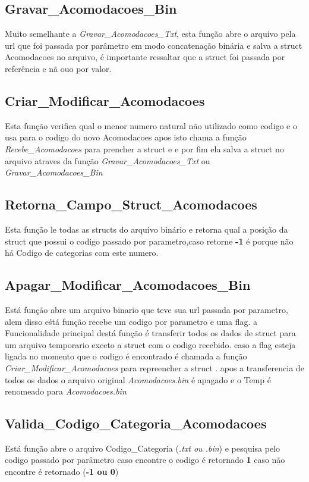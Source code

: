 \documentclass{article}
\begin{document}
\subsection{Gravar\_Acomodacoes\_Bin}
	Muito semelhante a \textit{Gravar\_Acomodacoes\_Txt}, esta função abre o arquivo pela url que foi passada por parâmetro em modo concatenação binária e salva a struct Acomodacoes  no arquivo, é importante ressaltar que  a struct foi passada por referência e nã ouo por valor.

\subsection{Criar\_Modificar\_Acomodacoes}
	Esta função verifica qual o menor numero natural não utilizado como codigo e o usa para o codigo do novo Acomodacoes apos isto  chama a função \textit{Recebe\_Acomodacoes} para prencher a struct e e por fim ela salva a struct no arquivo atraves da função \textit{Gravar\_Acomodacoes\_Txt} ou \textit{Gravar\_Acomodacoes\_Bin}

\subsection{Retorna\_Campo\_Struct\_Acomodacoes}
	Esta função le todas as structs do arquivo binário e retorna qual a posição da struct que possui o codigo passado por parametro,caso retorne \textbf{-1} é porque não há Codigo de categorias com este numero.

\subsection{Apagar\_Modificar\_Acomodacoes\_Bin}
	Está função abre um arquivo binario que teve sua  url passada por parametro, alem disso eśtá função recebe um codigo por parametro e uma flag.
	a Funcionalidade principal destá função é transferir todos os dados de struct para um arquivo temporario exceto a struct com o codigo recebido. caso a flag esteja ligada no momento que o codigo é encontrado é chamada a função \textit{Criar\_Modificar\_Acomodacoes} para repreencher a struct . apos a transferencia de todos os dados o arquivo original \textit{Acomodacoes.bin} é apagado e o Temp é renomeado para \textit{Acomodacoes.bin}


\subsection{Valida\_Codigo\_Categoria\_Acomodacoes}
	Está função  abre o arquivo Codigo\_Categoria (\textit{.txt ou .bin}) e pesquisa pelo codigo passado por parâmetro caso encontre o codigo é retornado \textbf{1} caso  não encontre é retornado (\textbf{-1 ou 0})
	
\end{document}
